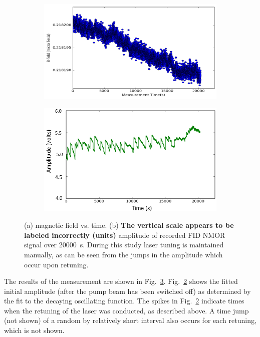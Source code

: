 \begin{figure}
  \centering
  \begin{subfigure}[b]{0.45\textwidth}
    \centering
    \includegraphics[width=\textwidth]{figures/manual_tuning}
    \caption{}
    \label{fig:field-manual-tuning}
  \end{subfigure}
  \hfill
  \begin{subfigure}[b]{0.45\textwidth}
    \centering
    \includegraphics[width=\textwidth]{figures/amplitude_manual_tuning}
    \caption{}
    \label{fig:amplitude-manual-tuning}
  \end{subfigure}
  \caption{(a) magnetic field vs. time. (b) {\bf The vertical scale
      appears to be labeled incorrectly (units)} amplitude of recorded
    FID NMOR signal over 20000~s. During this study laser tuning is
    maintained manually, as can be seen from the jumps in the
    amplitude which occur upon retuning.}
  \label{fig:manual-tuning}
\end{figure}
   
The results of the measurement are shown in
Fig.~\ref{fig:manual-tuning}.  Fig.~\ref{fig:amplitude-manual-tuning}
shows the fitted initial amplitude (after the pump beam has been
switched off) as determined by the fit to the decaying oscillating
function.  The spikes in Fig.~\ref{fig:amplitude-manual-tuning}
indicate times when the retuning of the laser was conducted, as
described above.  A time jump (not shown) of a random by relatively
short interval also occurs for each retuning, which is not shown.


